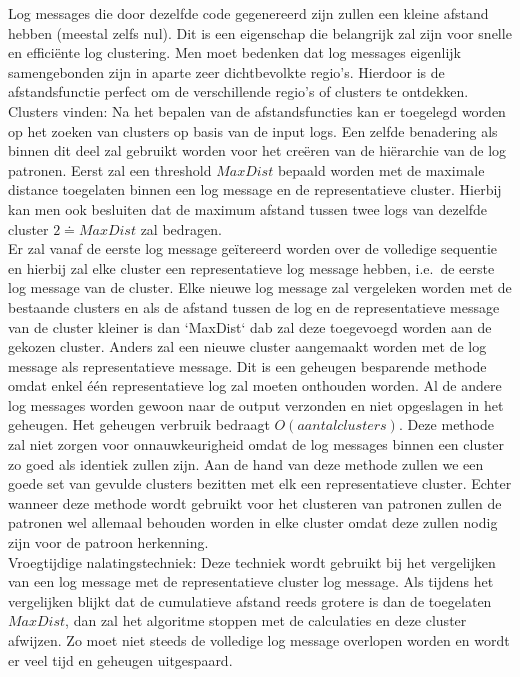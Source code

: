 \begin{itemize}
    Log messages die door dezelfde code gegenereerd zijn zullen een kleine afstand hebben (meestal zelfs nul). Dit is een eigenschap die belangrijk zal zijn voor snelle en efficiënte log clustering. Men moet bedenken dat log messages eigenlijk samengebonden zijn in aparte zeer dichtbevolkte regio's. Hierdoor is de afstandsfunctie perfect om de verschillende regio's of clusters te ontdekken.\\
    
    \subitem Clusters vinden: Na het bepalen van de afstandsfuncties kan er toegelegd worden op het zoeken van clusters op basis van de input logs. Een zelfde benadering als binnen dit deel zal gebruikt worden voor het creëren van de hiërarchie van de log patronen. Eerst zal een threshold \(MaxDist\) bepaald worden met de maximale distance toegelaten binnen een log message en de representatieve cluster. Hierbij kan men ook besluiten dat de maximum afstand tussen twee logs van dezelfde cluster \(2 \doteq MaxDist\) zal bedragen.\\
    
    Er zal vanaf de eerste log message geïtereerd worden over de volledige sequentie en hierbij zal elke cluster een representatieve log message hebben, i.e.\ de eerste log message van de cluster. Elke nieuwe log message zal vergeleken worden met de bestaande clusters en als de afstand tussen de log en de representatieve message van de cluster kleiner is dan `MaxDist` dab zal deze toegevoegd worden aan de gekozen cluster. Anders zal een nieuwe cluster aangemaakt worden met de log message als representatieve message. Dit is een geheugen besparende methode omdat enkel één representatieve log zal moeten onthouden worden. Al de andere log messages worden gewoon naar de output verzonden en niet opgeslagen in het geheugen. Het geheugen verbruik bedraagt \(O(aantal clusters)\). Deze methode zal niet zorgen voor onnauwkeurigheid omdat de log messages binnen een cluster zo goed als identiek zullen zijn. Aan de hand van deze methode zullen we een goede set van gevulde clusters bezitten met elk een representatieve cluster. Echter wanneer deze methode wordt gebruikt voor het clusteren van patronen zullen de patronen wel allemaal behouden worden in elke cluster omdat deze zullen nodig zijn voor de patroon herkenning.\\
    
    \subitem Vroegtijdige nalatingstechniek: Deze techniek wordt gebruikt bij het vergelijken van een log message met de representatieve cluster log message. Als tijdens het vergelijken blijkt dat de cumulatieve afstand reeds grotere is dan de toegelaten \(MaxDist\), dan zal het algoritme stoppen met de calculaties en deze cluster afwijzen. Zo moet niet steeds de volledige log message overlopen worden en wordt er veel tijd en geheugen uitgespaard.\\
    

\end{itemize}
